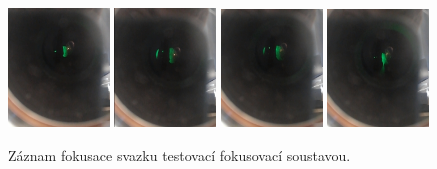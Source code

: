 \begin{figure}[h!]
\vspace{0.15cm}
\includegraphics[width=0.24\textwidth]{Figure/05/video/9.jpg}
\hfill
\includegraphics[width=0.24\textwidth]{Figure/05/video/10.jpg}
\hfill
\includegraphics[width=0.24\textwidth]{Figure/05/video/11.jpg}
\hfill
\includegraphics[width=0.24\textwidth]{Figure/05/video/12.jpg}
\vfill

\caption{Záznam fokusace svazku testovací fokusovací soustavou.}
\label{05video}
\end{figure}